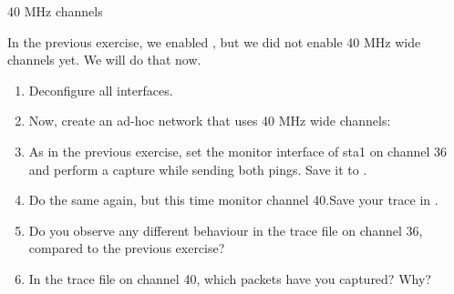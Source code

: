 \begin{exercise}{}
	
\end{exercise}

\begin{exercise}{40 MHz channels}

In the previous exercise, we enabled , but we did not enable 40 MHz wide channels yet. We will do that now.
\begin{enumerate}
	\item Deconfigure all  interfaces.\newline
	\item Now, create an ad-hoc network that uses 40 MHz wide channels:\newline
	\item As in the previous exercise, set the monitor interface of \ac{sta}1 on channel 36 and perform a capture while sending both pings. Save it to .
	\item Do the same again, but this time monitor channel 40.\newline Save your trace in .
	\item Do you observe any different behaviour in the trace file on channel 36, compared to the previous exercise?\newline
	\begin{esolution}
	\end{esolution}
	\item In the trace file on channel 40, which packets have you captured? Why?\newline
	\begin{esolution}
	\end{esolution}
\end{enumerate}
\end{exercise}
